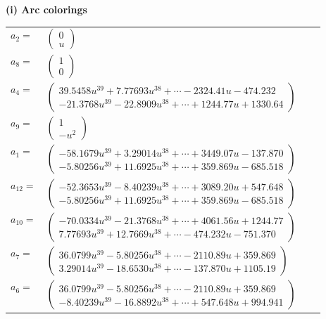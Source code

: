 \documentclass[1p]{elsarticle_modified}
\theoremstyle{definition}
\begin{document}
\flushleft \textbf{(i) Arc colorings}\\
\begin{tabular}{m{7pt} m{180pt} m{7pt} m{180pt} }
\flushright $a_{2}=$&$\begin{pmatrix}0\\u\end{pmatrix}$ \\
\flushright $a_{8}=$&$\begin{pmatrix}1\\0\end{pmatrix}$ \\
\flushright $a_{4}=$&$\begin{pmatrix}39.5458 u^{39}+7.77693 u^{38}+\cdots-2324.41 u-474.232\\-21.3768 u^{39}-22.8909 u^{38}+\cdots+1244.77 u+1330.64\end{pmatrix}$ \\
\flushright $a_{9}=$&$\begin{pmatrix}1\\- u^2\end{pmatrix}$ \\
\flushright $a_{1}=$&$\begin{pmatrix}-58.1679 u^{39}+3.29014 u^{38}+\cdots+3449.07 u-137.870\\-5.80256 u^{39}+11.6925 u^{38}+\cdots+359.869 u-685.518\end{pmatrix}$ \\
\flushright $a_{12}=$&$\begin{pmatrix}-52.3653 u^{39}-8.40239 u^{38}+\cdots+3089.20 u+547.648\\-5.80256 u^{39}+11.6925 u^{38}+\cdots+359.869 u-685.518\end{pmatrix}$ \\
\flushright $a_{10}=$&$\begin{pmatrix}-70.0334 u^{39}-21.3768 u^{38}+\cdots+4061.56 u+1244.77\\7.77693 u^{39}+12.7669 u^{38}+\cdots-474.232 u-751.370\end{pmatrix}$ \\
\flushright $a_{7}=$&$\begin{pmatrix}36.0799 u^{39}-5.80256 u^{38}+\cdots-2110.89 u+359.869\\3.29014 u^{39}-18.6530 u^{38}+\cdots-137.870 u+1105.19\end{pmatrix}$ \\
\flushright $a_{6}=$&$\begin{pmatrix}36.0799 u^{39}-5.80256 u^{38}+\cdots-2110.89 u+359.869\\-8.40239 u^{39}-16.8892 u^{38}+\cdots+547.648 u+994.941\end{pmatrix}$ \\

\end{tabular}
\end{document}

